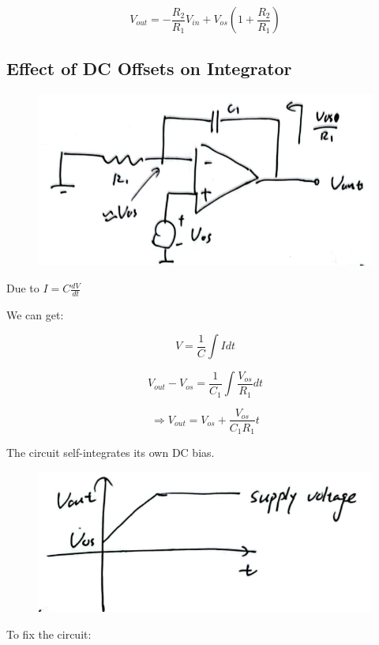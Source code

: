 \documentclass[fontset=windows]{article}
\begin{document}
$$V_{out}=-\frac{R_2}{R_1}V_{in}+V_{os}(1+\frac{R_2}{R_1})$$

\subsection*{Effect of DC Offsets on Integrator}

\begin{figure}[htbp]
    \centering
    \includegraphics[scale=0.8]{10.jpg}
    \captionsetup{labelformat=empty}
    \caption{}
    \label{10}
\end{figure}

Due to $I=C\frac{dV}{dt}$

We can get: 

$$V=\frac{1}{C}\int Idt$$

$$V_{out}-V_{os}=\frac{1}{C_1}\int \frac{V_{os}}{R_1}dt$$

$$\Longrightarrow V_{out}=V_{os}+\frac{V_{os}}{C_1R_1}t$$

The circuit self-integrates its own DC bias. 

\begin{figure}[htbp]
    \centering
    \includegraphics[scale=0.8]{12.jpg}
    \captionsetup{labelformat=empty}
    \caption{}
    \label{12}
\end{figure}

To fix the circuit: 
\end{document}
